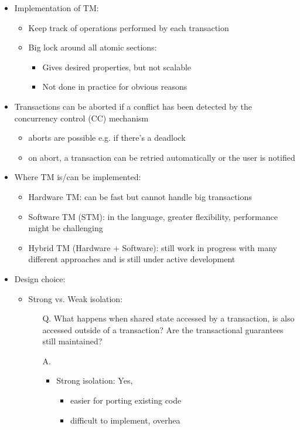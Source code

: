 \documentclass[a4paper]{article}
\begin{document}
\begin{itemize}
\item Implementation of TM:
\begin{itemize}
\item Keep track of operations performed by each transaction
\item Big lock around all atomic sections:
\begin{itemize}
\item Gives desired properties, but not scalable
\item Not done in practice for obvious reasons
\end{itemize}
\end{itemize}
\item Transactions can be aborted if a conflict has been detected by the concurrency control (CC) mechanism 
\begin{itemize}
\item aborts are possible e.g. if there’s a deadlock
\item on abort, a transaction can be retried automatically or the user is notified
\end{itemize}
\item Where TM is/can be implemented: 
\begin{itemize}
\item Hardware TM: can be fast but cannot handle big transactions
\item Software TM (STM): in the language, greater flexibility, performance might be challenging
\item Hybrid TM (Hardware + Software): still work in progress with many different approaches and is still under active development
\end{itemize}
\item Design choice: 
\begin{itemize}
\item Strong vs. Weak isolation:
\begin{enumerate}
\item[Q.] What happens when shared state accessed by a transaction, is also accessed outside of a transaction? Are the transactional guarantees still maintained? 
\item[A.]
\begin{itemize}
\item Strong isolation: Yes, 
\begin{itemize}
\item easier for porting existing code
\item difficult to implement, overhea
\end{itemize}

\end{itemize}
\end{enumerate}
\end{itemize}
\end{itemize}
\end{document}
